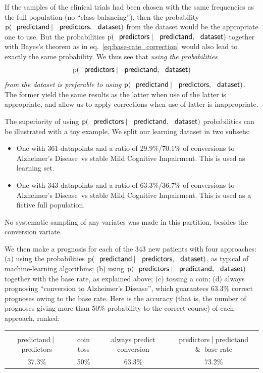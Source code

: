 \documentclass[utf8]{FrontiersinHarvard} %
\newcommand*{\amp}{\&}
\newcommand*{\eqn}{eq.}%
\newcommand*{\p}{\mathrm{p}}%
\renewcommand*{\|}[1][]{\nonscript\:#1\vert\nonscript\:\mathopen{}}
\newcommand*{\ad}{Alzheimer's Disease}
\newcommand*{\mci}{Mild Cognitive Impairment}
\begin{document}
If the samples of the clinical trials had been chosen with the same frequencies as the full population (no \enquote{class balancing}), then the probability $\p(\textsf{\small predictand} \| \textsf{\small predictors}, \textsf{\small dataset})$ from the dataset would be the appropriate one to use. But the probabilities $\p(\textsf{\small predictors} \| \textsf{\small predictand}, \textsf{\small dataset})$ together with Bayes's theorem as in \eqn~\eqref{eq:base-rate_correction} would also lead to exactly the same probability. We thus see that \emph{using the probabilities}
\[\p(\textsf{\small predictors} \| \textsf{\small predictand}, \textsf{\small dataset})\]
\emph{from the dataset is preferable to using} $\p(\textsf{\small predictand} \| \textsf{\small predictors}, \textsf{\small dataset})$. The former yield the same results as the latter when use of the latter is appropriate, and allow us to apply corrections when use of latter is inappropriate.

The superiority of using $\p(\textsf{\small predictors} \| \textsf{\small predictand}, \textsf{\small dataset})$ probabilities can be illustrated with a toy example. We split our learning dataset in two subsets:
\begin{itemize}
\item One with 361 datapoints and a ratio of 29.9\%/70.1\% of conversions to \ad\ vs stable \mci. This is used as learning set.
\item One with 343 datapoints and a ratio of 63.3\%/36.7\% of conversions to \ad\ vs stable \mci. This is used as a fictive full population.
\end{itemize}
No systematic sampling of any variates was made in this partition, besides the conversion variate.

We then make a prognosis for each of the 343 new patients with four approaches: (a) using the probabilities $\p(\textsf{\small predictand} \| \textsf{\small predictors}, \textsf{\small dataset})$, as typical of machine-learning algorithms; (b) using $\p(\textsf{\small predictors} \| \textsf{\small predictand}, \textsf{\small dataset})$ together with the base rate, as explained above; (c) tossing a coin; (d) always prognosing \enquote{conversion to \ad}, which guarantees 63.3\% correct prognoses owing to the base rate. Here is the accuracy (that is, the number of prognoses giving more than 50\% probability to the correct course) of each approach, ranked:

\medskip
  
\begin{table}[!h]
  \centering
  \begin{tabular}{cccc}
    \hline\\[-\jot]
    {\scriptsize predictand$\|$predictors}&{\scriptsize coin toss}&{\scriptsize always predict conversion}&{\scriptsize predictors$\|$predictand \amp\ base rate}
    \\[1\jot]
    37.3\% & 50\% & 63.3\% & 73.2\%\\[\jot]
    \hline
  \end{tabular}
\end{table}
\end{document}
